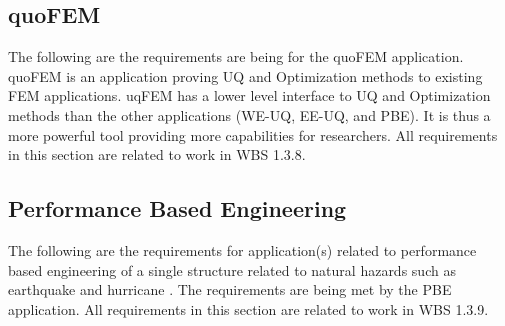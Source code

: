 \documentclass{simcenterdocumentation}
\begin{document}
 


\clearpage
\subsection{quoFEM}
The following are the requirements are being for the quoFEM application. quoFEM is an application proving UQ and Optimization methods to existing FEM applications. uqFEM has a lower level interface to UQ and Optimization methods than the other applications (WE-UQ, EE-UQ, and PBE). It is thus a more powerful tool providing more capabilities for researchers. All requirements in this section are related to work in WBS 1.3.8.

 

\clearpage
\subsection{Performance Based Engineering}
The following are the requirements for application(s) related to performance based engineering of a single structure related to natural hazards such as earthquake and hurricane . The requirements are being met by the PBE application. All requirements in this section are related to work in WBS 1.3.9.

 


\pagestyle{plain}
{
  \renewcommand{\thispagestyle}[1]{}	
  \printbibliography           
}
\end{document}
